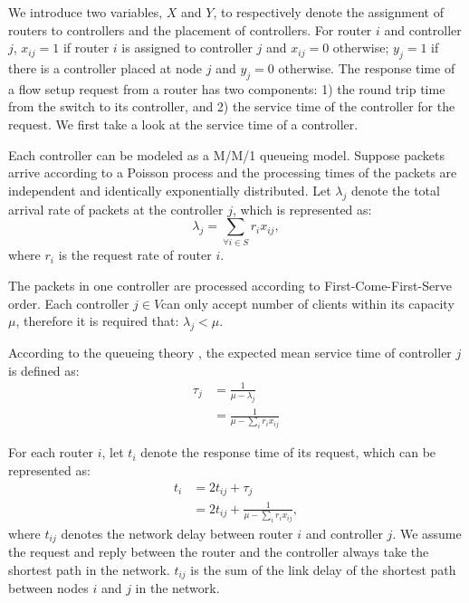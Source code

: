 \documentclass[conference]{IEEEtran}
\begin{document}
We introduce two variables, $X$ and $Y$, to respectively denote the assignment of routers to controllers and the placement of controllers. For router $i$ and controller $j$, $x_{ij}=1$ if router $i$ is assigned to controller $j$ and $x_{ij}=0$ otherwise; $y_j=1$ if there is a controller placed at node $j$ and $y_j=0$ otherwise. 
The response time of a flow setup request from a router has two components: 1) the round trip time from the switch to its controller, and 2) the service time of the controller for the request. We first take a look at the service time of a controller.       

Each controller can be modeled as a M/M/1 queueing model. Suppose packets arrive according to a Poisson process and the processing times of the packets are independent and identically exponentially distributed. Let $\lambda_j$ denote the total arrival rate of packets at the controller $j$, which is represented as:
\begin{equation}
\lambda_j = \sum_{\forall i\in S} r_ix_{ij},
\end{equation}
where $r_i$ is the request rate of router $i$. 

The packets in one controller are processed according to First-Come-First-Serve order. Each controller $j\in V$can only accept number of clients within its capacity $\mu$, therefore it is required that: $\lambda_j<\mu$.


According to the queueing theory \cite{gross2008fundamentals}, the expected mean service time of controller $j$ is defined as:
\begin{equation}
\begin{aligned}
\tau_j & = \frac{1}{\mu-\lambda_j} \\
& = \frac{1}{\mu-\sum_{i} r_ix_{ij}}
\end{aligned}
\end{equation}

For each router $i$, let $t_i$ denote the response time of its request, which can be represented as:
\begin{equation}
\begin{aligned}
t_i & = 2t_{ij}+\tau_j \\
& = 2t_{ij}+\frac{1}{\mu-\sum_{i}r_ix_{ij}},
\end{aligned}
\end{equation}
where $t_{ij}$ denotes the network delay between router $i$ and controller $j$. We assume the request and reply between the router and the controller always take the shortest path in the network. $t_{ij}$ is the sum of the link delay of the shortest path between nodes $i$ and $j$ in the network.
\end{document}

